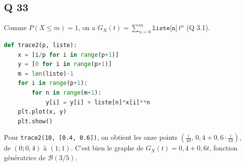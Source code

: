 \documentclass[11pt,a4paper]{article}
\begin{document}
\hypertarget{q-33}{%
\subsection{Q 33}\label{q-33}}

Comme \(P(X\le m)=1\), on a \(G_X(t)=\sum_{n=0}^m\texttt{liste[n]}\,t^n\) (Q 3.1).

\begin{lstlisting}[language=Python]
def trace2(p, liste):
    x = [i/p for i in range(p+1)]
    y = [0 for i in range(p+1)]
    m = len(liste)-1
    for i in range(p+1):
        for n in range(m+1):
            y[i] = y[i] + liste[n]*x[i]**n
    plt.plot(x, y)
    plt.show()
\end{lstlisting}

Pour \texttt{trace2(\allowbreak{}10,\allowbreak{}\ {[}0.4,\allowbreak{}\ 0.6{]}\allowbreak{})\allowbreak{}}, on obtient les onze points \((\frac i{10},\,0{,}4+0{,}6\cdot\frac i{10})\), de \((0;0{,}4)\) à \((1;1)\). C'est bien le graphe de \(G_X(t)=0{,}4+0{,}6t\), fonction génératrice de \(\mathcal B(3/5)\).
\end{document}
